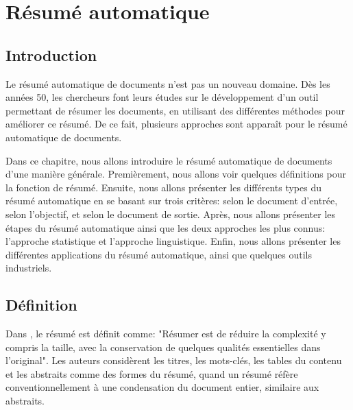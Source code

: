\documentclass[a4paper,12pt,oneside]{../use/ESIthesis}
\begin{document}
  	 	
  	 	\dominitoc 
  	 	\mainmatter
  \fi

\chapter{Résumé automatique}%
\label{chap:RA}
\minitoc
	
\section{Introduction}

Le résumé automatique de documents n'est pas un nouveau domaine. 
Dès les années 50, les chercheurs font leurs études sur le développement d'un outil permettant de résumer les documents, en utilisant des différentes méthodes pour améliorer ce résumé. 
De ce fait, plusieurs approches sont apparaît pour le résumé automatique de documents. 

Dans ce chapitre, nous allons introduire le résumé automatique de documents d'une manière générale. 
Premièrement, nous allons voir quelques définitions pour la fonction de résumé. 
Ensuite, nous allons présenter les différents types du résumé automatique en se basant sur trois critères: selon le document d'entrée, selon l'objectif, et selon le document de sortie. 
Après, nous allons présenter les étapes du résumé automatique ainsi que les deux approches les plus connus: l'approche statistique et l'approche linguistique. 
Enfin, nous allons présenter les différentes applications du résumé automatique, ainsi que quelques outils industriels. 

\section{Définition}

Dans \cite{95-kupiec-al}, le résumé est définit comme: 
"Résumer est de réduire la complexité y compris la taille, avec la conservation de quelques qualités essentielles dans l'original". 
Les auteurs considèrent les titres, les mots-clés, les tables du contenu et les abstraits comme des formes du résumé, 
quand un résumé réfère conventionnellement à une condensation du document entier, similaire aux abstraits.
\end{document}
